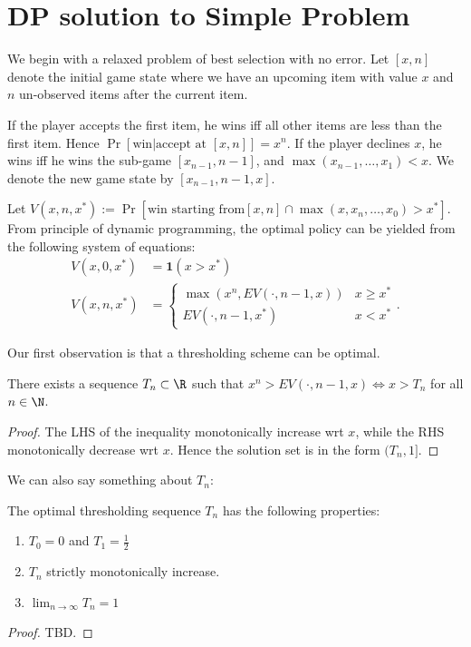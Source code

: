 
\section{DP solution to Simple Problem}
We begin with a relaxed problem of best selection with no error. Let $[x,n]$ denote the initial game state where we have an upcoming item with value $x$ and $n$ un-observed items after the current item.

If the player accepts the first item, he wins iff all other items are less than the first item. Hence $\operatorname{Pr}\left[{\text{win} | \text{accept at } [x,n]}\right] = x^{n}$.  
If the player declines $x$, he wins iff he wins the sub-game $[x_{n-1}, n-1]$, and $\max(x_{n-1}, \ldots, x_1) < x$. We denote the new game state by $[x_{n-1}, n-1, x]$.

Let $V(x,n,x^*) := \operatorname{Pr}\left[{\text{win starting from} [x,n] \cap \max\left( x, x_n, \ldots, x_0 \right) > x^*}\right] $. From principle of dynamic programming, the optimal policy can be yielded from the following system of equations:
\begin{align*}
	V(x, 0, x^*) &= \textbf{1}(x>x^*)\\
	V(x, n, x^*) &= \begin{cases}
		\max\left( x^n,   EV(\cdot,n-1, x)\right) &x\ge x^*\\
		EV(\cdot, n-1, x^*) &x<x^*
	\end{cases}
.\end{align*}

Our first observation is that a thresholding scheme can be optimal.

\begin{theorem}
	There exists a sequence $T_n \subset \R$ such that $ x^n>  EV(\cdot,n-1, x)\iff x > T_n$ for all $n \in  \N$. 
\end{theorem}
\begin{proof}
	The LHS of the inequality monotonically increase wrt $x$, while the RHS monotonically decrease wrt $x$. Hence the solution set is in the form $(T_n, 1]$.
\end{proof}

We can also say something about $T_n $:

\begin{theorem}
	The optimal thresholding sequence $T_n$ has the following properties:
	\begin{enumerate}
		\item $T_0 = 0 $ and $T_1 = \frac{1}{2}$
		 \item $T_n$ strictly monotonically increase.
		\item  $\lim_{n \to \infty} T_n = 1$
	\end{enumerate}
\end{theorem}
\begin{proof}
	TBD.
\end{proof}

